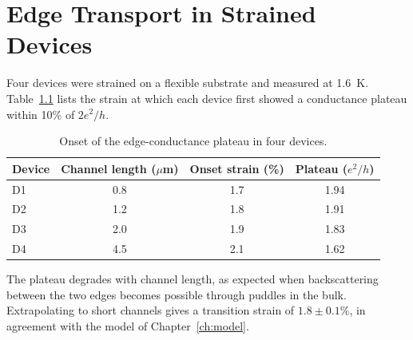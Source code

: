 \chapter{Edge Transport in Strained Devices}
\label{ch:transport}

Four devices were strained on a flexible substrate and measured at 1.6~K.
Table~\ref{tab:devices} lists the strain at which each device first showed a conductance
plateau within 10\% of $2e^2/h$.

\begin{table}[htbp]
  \centering
  \caption{Onset of the edge-conductance plateau in four devices.}
  \label{tab:devices}
  \begin{tabular}{lccc}
    \toprule
    Device & Channel length ($\mu$m) & Onset strain (\%) & Plateau ($e^2/h$) \\
    \midrule
    D1 & 0.8 & 1.7 & 1.94 \\
    D2 & 1.2 & 1.8 & 1.91 \\
    D3 & 2.0 & 1.9 & 1.83 \\
    D4 & 4.5 & 2.1 & 1.62 \\
    \bottomrule
  \end{tabular}
\end{table}

The plateau degrades with channel length, as expected when backscattering between the two
edges becomes possible through puddles in the bulk. Extrapolating to short channels gives a
transition strain of $1.8 \pm 0.1\%$, in agreement with the model of Chapter~\ref{ch:model}.
